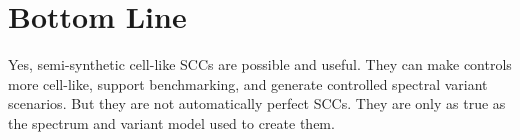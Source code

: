 \documentclass[11pt]{article}
\begin{document}
\section*{Bottom Line}

Yes, semi-synthetic cell-like SCCs are possible and useful. They can make
controls more cell-like, support benchmarking, and generate controlled spectral
variant scenarios. But they are not automatically perfect SCCs. They are only
as true as the spectrum and variant model used to create them.
\end{document}
